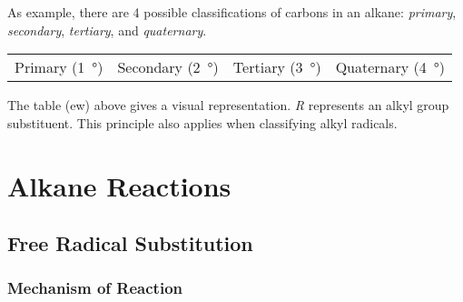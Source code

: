 		As example, there are 4 possible classifications of carbons in an alkane: \textit{primary}, \textit{secondary}, \textit{tertiary},
		and \textit{quaternary}.

		\begin{center}\begin{table}[ht]\renewcommand{\arraystretch}{1.4}
		\begin{tabu} to \textwidth {| X[c,m] | X[c,m] | X[c,m] | X[c,m] |}

			\hline
			\vspace{2mm}								\vspace{2mm}	&
			\vspace{2mm}						\vspace{2mm}	&
			\vspace{2mm}				\vspace{2mm}	&
			\vspace{2mm}		\vspace{2mm}	\\

			\hline
			Primary (\SI{1}{\degree})		&
			Secondary (\SI{2}{\degree})		&
			Tertiary (\SI{3}{\degree})		&
			Quaternary (\SI{4}{\degree})	\\
			\hline

		\end{tabu}
		\end{table}\end{center}\vspace{-10mm}

		The table (ew) above gives a visual representation. \textit{R} represents an alkyl group substituent. This principle
		also applies when classifying alkyl radicals.



	\pagebreak
	\section{Alkane Reactions}
		\subsection{Free Radical Substitution}

			\subsubsection{Mechanism of Reaction}

